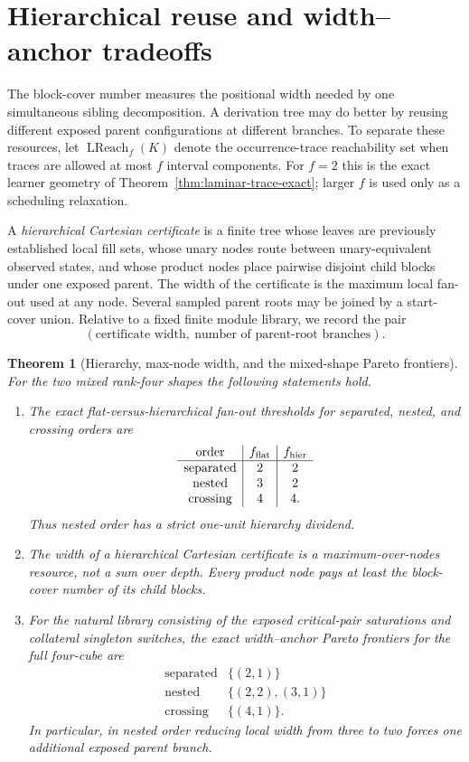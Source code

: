 \documentclass[11pt]{article}
\newtheorem{theorem}[definition]{Theorem}
\begin{document}
\section{Hierarchical reuse and width--anchor tradeoffs}
\label{sec:hierarchy-tradeoffs}

The block-cover number measures the positional width needed by one simultaneous
sibling decomposition.  A derivation tree may do better by reusing different
exposed parent configurations at different branches.  To separate these
resources, let $\operatorname{LReach}_f(K)$ denote the occurrence-trace
reachability set when traces are allowed at most $f$ interval components.
For $f=2$ this is the exact learner geometry of
Theorem~\ref{thm:laminar-trace-exact}; larger $f$ is used only as a scheduling
relaxation.

A \emph{hierarchical Cartesian certificate} is a finite tree whose leaves are
previously established local fill sets, whose unary nodes route between
unary-equivalent observed states, and whose product nodes place pairwise
disjoint child blocks under one exposed parent.  The width of the certificate
is the maximum local fan-out used at any node.  Several sampled parent roots
may be joined by a start-cover union.  Relative to a fixed finite module
library, we record the pair
\[
  (\text{certificate width},\ \text{number of parent-root branches}).
\]

\begin{theorem}[Hierarchy, max-node width, and the mixed-shape Pareto frontiers]
\label{thm:hierarchy-package}
For the two mixed rank-four shapes the following statements hold.
\begin{enumerate}[label=\textup{(\roman*)},leftmargin=*]
\item The exact flat-versus-hierarchical fan-out thresholds for separated,
nested, and crossing orders are
\[
\begin{array}{c|c|c}
\text{order}& f_{\rm flat}& f_{\rm hier}\\ \hline
\text{separated}&2&2\\
\text{nested}&3&2\\
\text{crossing}&4&4.
\end{array}
\]
Thus nested order has a strict one-unit hierarchy dividend.
\item The width of a hierarchical Cartesian certificate is a
\emph{maximum-over-nodes} resource, not a sum over depth.  Every product node
pays at least the block-cover number of its child blocks.
\item For the natural library consisting of the exposed critical-pair
saturations and collateral singleton switches, the exact width--anchor Pareto
frontiers for the full four-cube are
\[
 \boxed{
 \begin{array}{c|c}
 \text{separated}&\{(2,1)\}\\
 \text{nested}&\{(2,2),(3,1)\}\\
 \text{crossing}&\{(4,1)\}.
 \end{array}}
\]
In particular, in nested order reducing local width from three to two forces
one additional exposed parent branch.
\end{enumerate}
\end{theorem}
\end{document}
